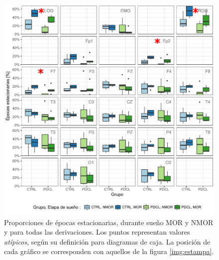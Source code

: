 \documentclass[12pt,letterpaper]{book}
\begin{document}
\begin{figure}
\centering
\includegraphics[width=\linewidth]
{./scripts_graf_res/comparacion_cabeza.pdf}
\caption{Proporciones de épocas estacionarias, durante sueño MOR y NMOR y para todas las derivaciones.
%
Los puntos representan valores \textit{atípicos}, según su definición para diagramas de caja.
%
La posición de cada gráfico se corresponden con aquellos de la figura \ref{img:estampa}.}
\label{comparacion_verde}
\end{figure}

%

\end{document}
